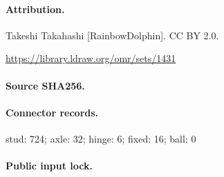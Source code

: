\paragraph{Attribution.}Takeshi Takahashi [RainbowDolphin]. CC BY 2.0.\par\url{https://library.ldraw.org/omr/sets/1431}
\paragraph{Source SHA256.}
\paragraph{Connector records.}stud: 724; axle: 32; hinge: 6; fixed: 16; ball: 0
\paragraph{Public input lock.}
